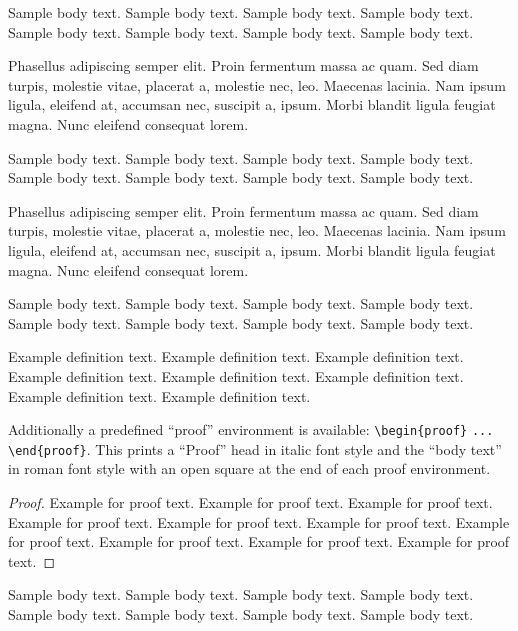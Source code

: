 \documentclass{article}
\begin{document}
Sample body text. Sample body text. Sample body text. Sample body text. Sample body text. Sample body text. Sample body text. Sample body text.

\begin{example}
Phasellus adipiscing semper elit. Proin fermentum massa
ac quam. Sed diam turpis, molestie vitae, placerat a, molestie nec, leo. Maecenas lacinia. Nam ipsum ligula, eleifend
at, accumsan nec, suscipit a, ipsum. Morbi blandit ligula feugiat magna. Nunc eleifend consequat lorem. 
\end{example}

Sample body text. Sample body text. Sample body text. Sample body text. Sample body text. Sample body text. Sample body text. Sample body text.

\begin{remark}
Phasellus adipiscing semper elit. Proin fermentum massa
ac quam. Sed diam turpis, molestie vitae, placerat a, molestie nec, leo. Maecenas lacinia. Nam ipsum ligula, eleifend
at, accumsan nec, suscipit a, ipsum. Morbi blandit ligula feugiat magna. Nunc eleifend consequat lorem. 
\end{remark}

Sample body text. Sample body text. Sample body text. Sample body text. Sample body text. Sample body text. Sample body text. Sample body text.

\begin{definition}
Example definition text. Example definition text. Example definition text. Example definition text. Example definition text. Example definition text. Example definition text. Example definition text. 
\end{definition}

Additionally a predefined ``proof'' environment is available: \verb+\begin{proof}+ \verb+...+ \verb+\end{proof}+. This prints a ``Proof'' head in italic font style and the ``body text'' in roman font style with an open square at the end of each proof environment. 

\begin{proof}
Example for proof text. Example for proof text. Example for proof text. Example for proof text. Example for proof text. Example for proof text. Example for proof text. Example for proof text. Example for proof text. Example for proof text. 
\end{proof}

Sample body text. Sample body text. Sample body text. Sample body text. Sample body text. Sample body text. Sample body text. Sample body text.
\end{document}
